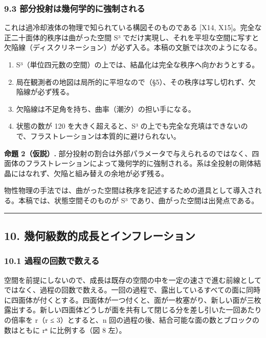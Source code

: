 \documentclass[
  a4paper,
]{ltjsarticle}
\providecommand{\tightlist}{%
  \setlength{\itemsep}{0pt}\setlength{\parskip}{0pt}}
\begin{document}
\subsubsection{9.3
部分投射は幾何学的に強制される}\label{ux90e8ux5206ux6295ux5c04ux306fux5e7eux4f55ux5b66ux7684ux306bux5f37ux5236ux3055ux308cux308b}

これは過冷却液体の物理で知られている構図そのものである {[}X14,
X15{]}。完全な正二十面体的秩序は曲がった空間 S³
でだけ実現し、それを平坦な空間に写すと欠陥線（ディスクリネーション）が必ず入る。本稿の文脈では次のようになる。

\begin{enumerate}
\def\labelenumi{\arabic{enumi}.}
\tightlist
\item
  S³（単位四元数の空間）の上では、結晶化は完全な秩序へ向かおうとする。
\item
  局在観測者の地図は局所的に平坦なので（§5）、その秩序は写し切れず、欠陥線が必ず残る。
\item
  欠陥線は不足角を持ち、曲率（潮汐）の担い手になる。
\item
  状態の数が 120 を大きく超えると、S³
  の上でも完全な充填はできないので、フラストレーションは本質的に避けられない。
\end{enumerate}

\textbf{命題 2（仮説）.}
部分投射の割合は外部パラメータで与えられるのではなく、四面体のフラストレーションによって幾何学的に強制される。系は全投射の剛体結晶にはなれず、欠陥と組み替えの余地が必ず残る。

物性物理の手法では、曲がった空間は秩序を記述するための道具として導入される。本稿では、状態空間そのものが
S³ であり、曲がった空間は出発点である。

\begin{center}\rule{0.5\linewidth}{0.5pt}\end{center}

\subsection{10.
幾何級数的成長とインフレーション}\label{ux5e7eux4f55ux7d1aux6570ux7684ux6210ux9577ux3068ux30a4ux30f3ux30d5ux30ecux30fcux30b7ux30e7ux30f3}

\subsubsection{10.1
過程の回数で数える}\label{ux904eux7a0bux306eux56deux6570ux3067ux6570ux3048ux308b}

空間を前提にしないので、成長は既存の空間の中を一定の速さで進む前線としてではなく、過程の回数で数える。一回の過程で、露出しているすべての面に同時に四面体が付くとする。四面体が一つ付くと、面が一枚塞がり、新しい面が三枚露出する。新しい四面体どうしが面を共有して閉じる分を差し引いた一回あたりの倍率を
r（r ≤ 3）とすると、n
回の過程の後、結合可能な面の数とブロックの数はともに rⁿ に比例する（図 8
左）。
\end{document}
